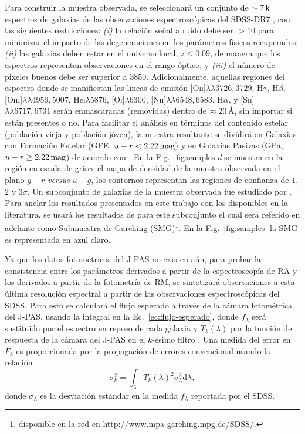 Para construir la muestra observada, se seleccionará un conjunto de $\sim\unit[7]{k}$ espectros de
galaxias de las observaciones espectroscópicas del SDSS-DR7 \citep{Abazajian2009}, con las
siguientes restricciones: \textit{(i)} la relación señal a ruido debe ser $>10$ para minimizar el
impacto de las degeneraciones en los parámetros físicos recuperados; \textit{(ii)} las galaxias
deben estar en el universo local, $z\leq0.09$, de manera que los espectros representan observaciones
en el rango óptico; y \textit{(iii)} el número de pixeles buenos debe ser superior a $3850$.
Adicionalmente, aquellas regiones del espectro donde se manifiestan las líneas de emisión
[O\textsc{ii}]$\lambda\lambda3726,3729$, H$\gamma$, H$\beta$,
[O\textsc{iii}]$\lambda\lambda4959,5007$, He\textsc{i}$\lambda5876$, [O\textsc{i}]$\lambda6300$,
[N\textsc{ii}]$\lambda\lambda6548,6583$, H$\alpha$, y [S\textsc{ii}]$\lambda\lambda6717,6731$ serán
enmascaradas (removidas) dentro de $\approx\unit[20]{\AA}$, sin importar si están presentes o no.
Para facilitar el análisis en términos del contenido estelar (población vieja y población jóven), la
muestra resultante se dividirá en Galaxias con Formación Estelar (GFE, $u-r<\unit[2.22]{mag}$) y en
Galaxias Pasivas (GPa, $u-r\geq\unit[2.22]{mag}$) de acuerdo con \citet{Strateva2001}. En la
Fig.~\ref{fig:samples}\textit{d} se muestra en la región en escala de grises el mapa de densidad de
la muestra observada en el plano $g-r$ \emph{versus} $u-g$, los contornos representan las regiones
de confianza de $1$, $2$ y $3\sigma$. Un subconjunto de galaxias de la muestra observada fue
estudiado por \citet{Gallazzi2005}. Para anclar los resultados presentados en este trabajo con los
disponibles en la literatura, se usará los resultados de \citet{Gallazzi2005} para este subconjunto
el cual será referido en adelante como Submuestra de Garching (SMG)\footnote{disponible en la red en
\url{http://www.mpa-garching.mpg.de/SDSS/}.}. En la Fig.~\ref{fig:samples} la SMG es representada en
azul claro.

Ya que los datos fotométricos del J-PAS no existen aún, para probar la consistencia entre los
parámetros derivados a partir de la espectroscopía de RA y los derivados a partir de la fotometría
de RM, se sintetizará observaciones a esta última resolución espectral a partir de las observaciones
espectroscópicas del SDSS. Para esto se calculará el flujo esperado a través de la cámara
fotométrica del J-PAS,  usando la integral en la Ec.~\eqref{ec:flujo-esperado}, donde $f_\lambda$
será sustituido por el espectro en reposo de cada galaxia y $T_k(\lambda)$ por la función de
respuesta de la cámara del J-PAS en el $k$-ésimo filtro \citep{Marin-Franch2015}. Una medida del
error en $F_k$ es proporcionada por la propagación de errores convencional
\citep[\eg,][]{Bevington2003} usando la relación
%
\begin{equation}\label{ec:error-prop}
\sigma_k^2 = \int_\lambda T_k(\lambda)^2\sigma_\lambda^2\text{d}\lambda,
\end{equation}
%
donde $\sigma_\lambda$ es la desviación estándar en la medida $f_\lambda$ reportada por el
SDSS.

